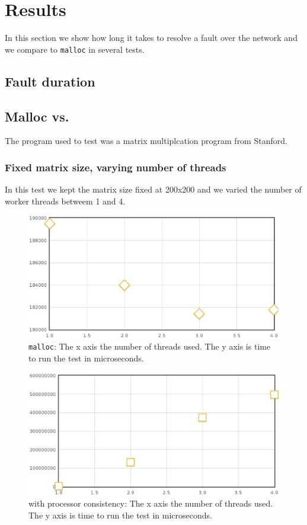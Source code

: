 \section{Results}

In this section we show how long it takes to resolve a fault over the network and we compare \projname{} to \verb,malloc, in several tests.

\subsection{Fault duration}


\subsection{Malloc vs. \projname{}}

The program used to test was a matrix multiplcation program from Stanford.

\subsubsection{Fixed matrix size, varying number of threads}

In this test we kept the matrix size fixed at 200x200 and we varied the number of worker threads betweem 1 and 4.

\begin{figure}[!h]
\centering
\includegraphics[scale=0.40]{images/malloc-fixed-matrix.eps}
\caption{\verb,malloc,: The x axis the number of threads used. The y axis is time to run the test in microseconds.}
\end{figure}

\begin{figure}[!h]
\centering
\includegraphics[scale=0.40]{images/mmult-lh-fixed-size.eps}
\caption{\projname{} with processor consistency: The x axis the number of threads used. The y axis is time to run the test in microseconds.}
\end{figure}

